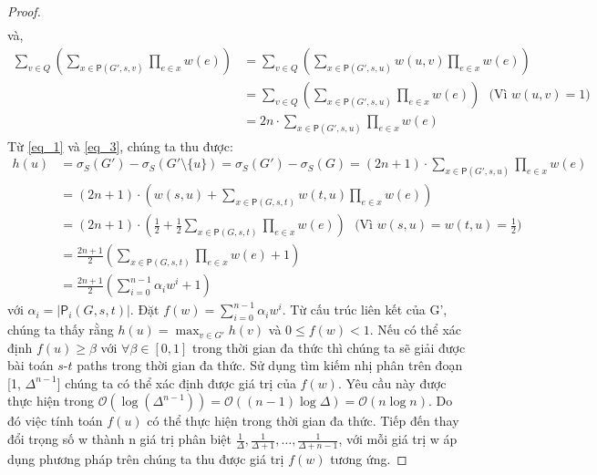 \begin{proof}
\begin{align}
	\label{eq_1}
	\end{align}  
	và, 
	\begin{align}
	\sum_{v \in  Q } \left(  \sum_{x \in \mathsf{P}(G', s, v)} \prod_{e \in x}w(e)  \right) &= \sum_{v \in Q} \left(  \sum_{x \in \mathsf{P}(G', s, u)} w(u, v)  \prod_{e \in x}w(e)  \right) \nonumber
	\\
	& =\sum_{v \in Q} \left(  \sum_{x \in \mathsf{P}(G', s, u)} \prod_{e \in x}w(e)  \right)\ \ \ \mbox{(Vì $w(u, v)=1$)} \nonumber
	\\
	& = 2n \cdot \sum_{x \in \mathsf{P}(G', s, u)} \prod_{e \in x}w(e)
	\label{eq_3}
	\end{align}
	Từ \eqref{eq_1} và \eqref{eq_3}, chúng ta thu được:
	\begin{align}
	h(u)&= \sigma_{S}(G')- \sigma_{S}(G'\setminus \{u\})=  \sigma_{S}(G')- \sigma_{S}(G)=(2n+1)\cdot \sum_{x \in \mathsf{P}(G', s, u)} \prod_{e \in x}w(e)
	\\
	& = (2n+1)\cdot \left(  w(s, u)+ \sum_{x \in \mathsf{P}(G, s, t)} w(t, u) \prod_{e \in x}w(e) \right) 
	\\
	& = (2n+1)\cdot \left(  \frac{1}{2}+ \frac{1}{2} \sum_{x \in \mathsf{P}(G, s, t)}  \prod_{e \in x}w(e) \right)  \ \ \ \mbox{(Vì $w(s, u)= w(t, u)=\frac{1}{2}$)}
	\\
	& = \frac{2n+1}{2} \left(  \sum_{x \in \mathsf{P}(G, s, t)}  \prod_{e \in x}w(e) +1 \right) 
	\\
	& = \frac{2n+1}{2} \left(  \sum_{i=0}^{n-1} \alpha_i w^i +1 \right) 
	\end{align}   		
	với $\alpha_i=|\mathsf{P}_i(G, s, t)|$. Đặt $f(w)=\sum_{i=0}^{n-1}\alpha_i w^i$. Từ cấu trúc liên kết của G', chúng ta thấy rằng $h(u)=\max_{v \in G'}h(v)$ và $0 \leq  f(w) < 1$. Nếu có thể xác định $f(u) \geq \beta$ với $\forall \beta \in [0, 1]$ trong thời gian đa thức thì chúng ta sẽ giải được bài toán $s$-$t$ paths trong thời gian đa thức. Sử dụng tìm kiếm nhị phân trên đoạn [1, $\Delta^{n-1}$] chúng ta có thể xác định được giá trị của $f(w)$. Yêu cầu này được thực hiện trong $\mathcal{O}(\log(\Delta^{n-1}))=\mathcal{O}((n-1)\log\Delta) =\mathcal{O}(n\log n)$. Do đó việc tính toán $f(u)$ có thể thực hiện trong thời gian đa thức. Tiếp đến thay đổi trọng số w thành n giá trị phân biệt $\frac{1}{\Delta}, \frac{1}{\Delta+1}, \ldots, \frac{1}{\Delta+n-1}$, với mỗi giá trị w áp dụng phương pháp trên chúng ta thu được giá trị $f(w)$ tương ứng. 
\end{proof}

